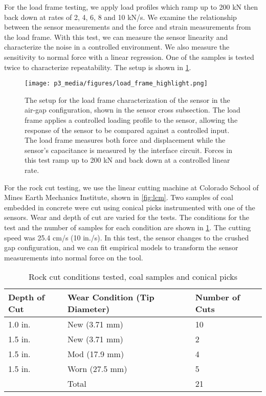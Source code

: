For the load frame testing, we apply load profiles which ramp up to 200 kN 
then back down at rates of 2, 4, 6, 8 and 10 kN/s. 
We examine the relationship between the sensor measurements 
and the force and strain measurements from the load frame.
With this test, we can measure the sensor linearity and characterize the noise
in a controlled environment. 
We also measure the sensitivity to normal force with a linear regression.
One of the samples is tested twice to characterize repeatability.
The setup is shown in \ref{fig:loadframe}.


\begin{figure}[t]
\centering
\texttt{[image: p3\_media/figures/load\_frame\_highlight.png]}
\caption{The setup for the load frame characterization of the sensor in the air-gap configuration, 
shown in the sensor cross subsection.
The load frame applies a controlled loading profile to the sensor, allowing the response of the sensor
to be compared against a controlled input. The load frame measures both force and displacement while
the sensor's capacitance is measured by the interface circuit.
Forces in this test ramp up to 200 kN and back down at a controlled linear rate.}
\label{fig:loadframe}
\end{figure}

For the rock cut testing, we use the linear cutting machine at Colorado School of Mines
Earth Mechanics Institute, shown in \ref{fig:lcm}. 
Two samples of coal embedded in concrete were cut 
using conical picks instrumented with one of the sensors.
Wear and depth of cut are varied for the tests.
The conditions for the test and the number of samples for each condition are shown in \ref{tab:data}.
The cutting speed was 25.4 cm/s (10 in./s).
In this test, the sensor changes to the crushed gap configuration,
and we can fit empirical models to transform the sensor measurements into 
normal force on the tool.

\begin{table}[]
\centering
\caption{Rock cut conditions tested, coal samples and conical picks}
\label{tab:data}
\begin{tabular}{|l|l|l|}
\hline
Depth of Cut             & Wear Condition (Tip Diameter) & Number of Cuts \\ \hline
1.0 in.                  & New (3.71 mm)  & 10             \\ \hline
1.5 in.                  & New (3.71 mm)  & 2              \\ \hline
1.5 in.                  & Mod (17.9 mm)  & 4              \\ \hline
1.5 in.                  & Worn (27.5 mm) & 5              \\ \hline
 & Total & 21 \\ \hline
\end{tabular}
\end{table}

